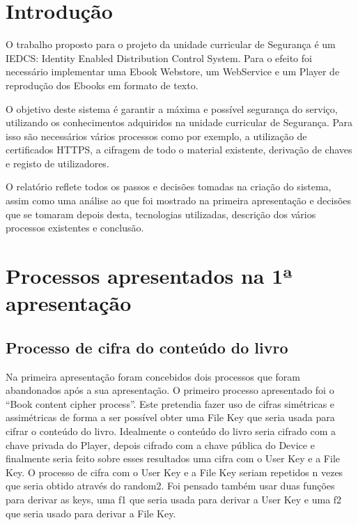 \documentclass[pdftex,12pt,a4paper]{report}
\begin{document}
\renewcommand{\headrulewidth}{0pt}

\fancyhead{}
\fancyfoot{}
\rfoot{\thepage}

\renewcommand*\contentsname{Conteúdos}
\renewcommand*\figurename{Figura}
\renewcommand*\tablename{Tabela}

\tableofcontents
\renewcommand{\headrulewidth}{0.15pt}
\renewcommand{\thechapter}{}


\clearpage

\section{Introdução}
O trabalho proposto para o projeto da unidade curricular de Segurança é um IEDCS: Identity Enabled Distribution Control System. Para o  efeito foi necessário implementar uma Ebook Webstore, um WebService e um Player de reprodução dos Ebooks em formato de texto.

O objetivo deste sistema é garantir a máxima e possível segurança do serviço, utilizando os conhecimentos adquiridos na unidade curricular de Segurança. Para isso são necessários vários processos como por exemplo, a utilização de certificados HTTPS, a cifragem de todo o material existente, derivação de chaves e registo de utilizadores.	

O relatório reflete todos os passos e decisões tomadas na criação do sistema, assim como uma análise ao que foi mostrado na primeira apresentação e decisões que se tomaram depois desta, tecnologias utilizadas, descrição dos vários processos existentes e conclusão.

\newpage
\section{Processos apresentados na 1ª apresentação}

\subsection{Processo de cifra do conteúdo do livro}
Na primeira apresentação foram concebidos dois processos que foram abandonados após a sua apresentação. O primeiro processo apresentado foi o “Book content cipher process”. Este pretendia fazer uso de cifras simétricas e assimétricas de forma a ser possível obter uma File Key que seria usada para cifrar o conteúdo do livro. Idealmente o conteúdo do livro seria cifrado com a chave privada do Player, depois cifrado com a chave pública do Device e finalmente seria feito sobre esses resultados uma cifra com o User Key e a File Key. O processo de cifra com o User Key e a File Key seriam repetidos n vezes que seria obtido através do random2. Foi pensado também usar duas funções para derivar as keys, uma f1 que seria usada para derivar a User Key e uma f2 que seria usado para derivar a File Key.
\end{document}
